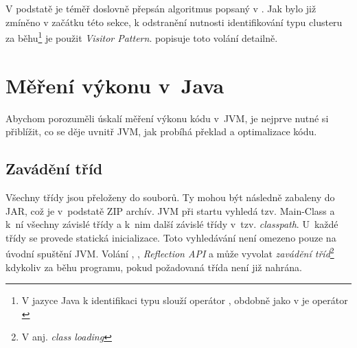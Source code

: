 V podstatě je téměř doslovně přepsán algoritmus popsaný v . Jak bylo již zmíněno v začátku této sekce, k odstranění nutnosti identifikování typu clusteru za běhu\footnote{V jazyce Java k identifikaci typu slouží operátor \cite{gosling2013java}, obdobně jako v \CC{} je operátor \cite{ISO:2012:CPP}} je použit \emph{Visitor Pattern}.  popisuje toto volání detailně.


%
%

\section{Měření výkonu v~Java\label{sec:vykonvjava}}

Abychom porozuměli úskalí měření výkonu kódu v~JVM, je nejprve nutné si přiblížit, co se děje uvnitř JVM, jak probíhá překlad a optimalizace kódu.

\subsection{Zavádění tříd}

Všechny třídy jsou přeloženy do \classfile{} souborů. Ty mohou být následně zabaleny do JAR, což je v~podstatě ZIP archív. JVM při startu vyhledá tzv. Main-Class a k~ní všechny závislé třídy a k~nim další závislé třídy v~tzv. \emph{classpath}. U~každé třídy se provede statická inicializace. Toto vyhledávání není omezeno pouze na úvodní spuštění JVM. Volání , , \emph{Reflection API} a  může vyvolat \emph{zavádění tříd}\footnote{V anj. \emph{class loading}} kdykoliv za běhu programu, pokud požadovaná třída není již nahrána\cite{gosling2013java}\cite{lindholm2013java}.

